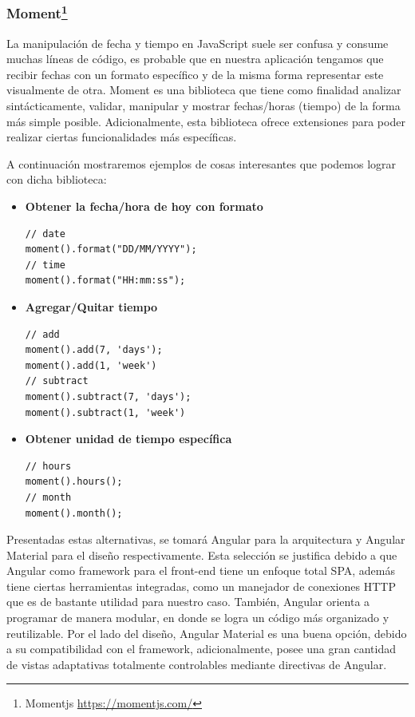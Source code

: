 \subsubsection[Moment]{Moment\footnote{Momentjs \url{https://momentjs.com/}}}

La manipulación de fecha y tiempo en JavaScript suele ser confusa y consume muchas líneas de código, es probable que en nuestra aplicación tengamos que recibir fechas con un formato específico y de la misma forma representar este visualmente de otra. Moment es una biblioteca que tiene como finalidad analizar sintácticamente, validar, manipular y mostrar fechas/horas (tiempo) de la forma más simple posible. Adicionalmente, esta biblioteca ofrece extensiones para poder realizar ciertas funcionalidades más específicas.

A continuación mostraremos ejemplos de cosas interesantes que podemos lograr con dicha biblioteca:

\begin{itemize}
\item\textbf{Obtener la fecha/hora de hoy con formato}
\begin{verbatim}
// date
moment().format("DD/MM/YYYY");
// time
moment().format("HH:mm:ss");
\end{verbatim}

\item\textbf{Agregar/Quitar tiempo}
\begin{verbatim}
// add
moment().add(7, 'days');
moment().add(1, 'week')
// subtract
moment().subtract(7, 'days');
moment().subtract(1, 'week')
\end{verbatim}

\item\textbf{Obtener unidad de tiempo específica}
\begin{verbatim}
// hours
moment().hours();
// month
moment().month();
\end{verbatim}
\end{itemize}

\bigbreak
Presentadas estas alternativas, se tomará Angular para la arquitectura y Angular Material para el diseño respectivamente. Esta selección se justifica debido a que Angular como framework para el front-end tiene un enfoque total SPA, además tiene ciertas herramientas integradas, como un manejador de conexiones HTTP que es de bastante utilidad para nuestro caso. También, Angular orienta a programar de manera modular, en donde se logra un código más organizado y reutilizable. Por el lado del diseño, Angular Material es una buena opción, debido a su compatibilidad con el framework, adicionalmente, posee una gran cantidad de vistas adaptativas totalmente controlables mediante directivas de Angular.